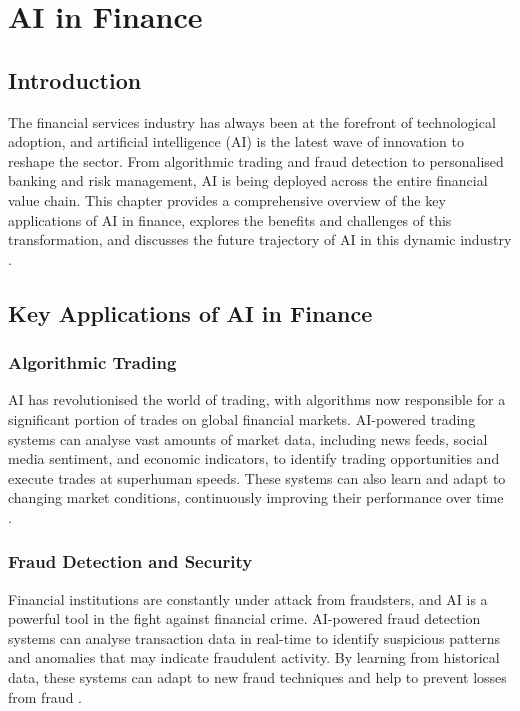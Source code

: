 \chapter{AI in Finance}
\label{cha:ai_in_finance}

\section{Introduction}

The financial services industry has always been at the forefront of technological adoption, and artificial intelligence (AI) is the latest wave of innovation to reshape the sector. From algorithmic trading and fraud detection to personalised banking and risk management, AI is being deployed across the entire financial value chain. This chapter provides a comprehensive overview of the key applications of AI in finance, explores the benefits and challenges of this transformation, and discusses the future trajectory of AI in this dynamic industry \parencite{lopez2019artificial}.

\section{Key Applications of AI in Finance}

\subsection{Algorithmic Trading}

AI has revolutionised the world of trading, with algorithms now responsible for a significant portion of trades on global financial markets. AI-powered trading systems can analyse vast amounts of market data, including news feeds, social media sentiment, and economic indicators, to identify trading opportunities and execute trades at superhuman speeds. These systems can also learn and adapt to changing market conditions, continuously improving their performance over time \parencite{rustandi2025ai}.

\subsection{Fraud Detection and Security}

Financial institutions are constantly under attack from fraudsters, and AI is a powerful tool in the fight against financial crime. AI-powered fraud detection systems can analyse transaction data in real-time to identify suspicious patterns and anomalies that may indicate fraudulent activity. By learning from historical data, these systems can adapt to new fraud techniques and help to prevent losses from fraud \parencite{fma2024understanding}.

